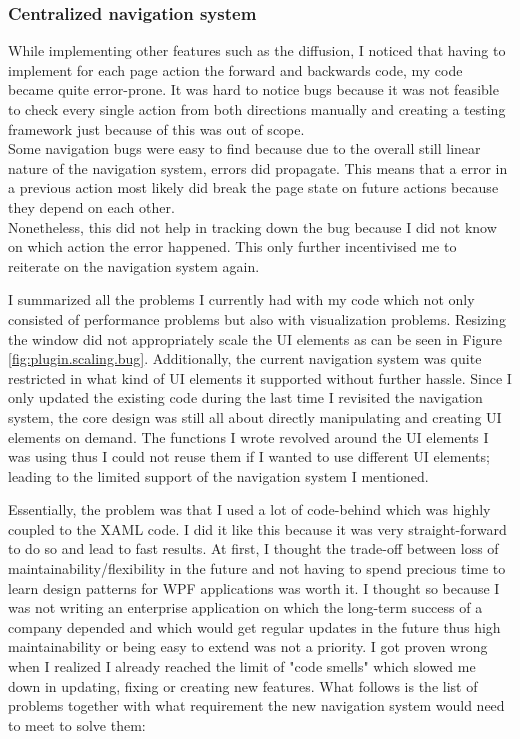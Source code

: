\subsubsection{Centralized navigation system}

While implementing other features such as the diffusion, I noticed that having to implement for each page action the forward and backwards code, my code became quite error-prone. It was hard to notice bugs because it was not feasible to check every single action from both directions manually and creating a testing framework just because of this was out of scope. \\
Some navigation bugs were easy to find because due to the overall still linear nature of the navigation system, errors did propagate. This means that a error in a previous action most likely did break the page state on future actions because they depend on each other. \\
Nonetheless, this did not help in tracking down the bug because I did not know on which action the error happened. This only further incentivised me to reiterate on the navigation system again.


I summarized all the problems I currently had with my code which not only consisted of performance problems but also with visualization problems. Resizing the window did not appropriately scale the UI elements as can be seen in Figure \ref{fig:plugin.scaling.bug}. Additionally, the current navigation system was quite restricted in what kind of UI elements it supported without further hassle. Since I only updated the existing code during the last time I revisited the navigation system, the core design was still all about directly manipulating and creating UI elements on demand. The functions I wrote revolved around the UI elements I was using thus I could not reuse them if I wanted to use different UI elements; leading to the limited support of the navigation system I mentioned.

Essentially, the problem was that I used a lot of code-behind which was highly coupled to the XAML code. I did it like this because it was very straight-forward to do so and lead to fast results. At first, I thought the trade-off between loss of maintainability/flexibility in the future and not having to spend precious time to learn design patterns for WPF applications was worth it. I thought so because I was not writing an enterprise application on which the long-term success of a company depended and which would get regular updates in the future thus high maintainability or being easy to extend was not a priority. I got proven wrong when I realized I already reached the limit of "code smells" which slowed me down in updating, fixing or creating new features. What follows is the list of problems together with what requirement the new navigation system would need to meet to solve them:

